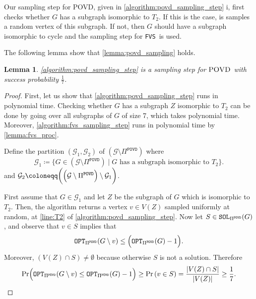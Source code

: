 \documentclass[letterpaper,11pt]{article}
\newcommand{\abs}[1]{{\left| #1\right|}}
\newcommand{\1}[1]{\mathds{1}\left[#1\right]}
\newcommand{\sat}{\textnormal{\texttt{SOL}}}
\newcommand{\OPT}{\textnormal{\texttt{OPT}}}
\newtheorem{lemma}[theorem]{Lemma}
\newcommand{\FVS}{\textnormal{\texttt{FVS}}\xspace}
\newcommand{\povdPi}{\Pi^{\texttt{POVD}}}
\newcommand{\spovd}{\textsc{POVD}\xspace}
\begin{document}
Our sampling step for \spovd, given in 
\cref{algorithm:povd_sampling_step} i,
first checks whether $G$ has a subgraph isomorphic to $T_2$. If this is the case, is samples a random vertex of this subgraph. 
If not, then $G$ should have a subgraph isomorphic to cycle and the sampling step for \FVS\ is used.

The following lemma show that \cref{lemma:povd_sampling} holds.
\begin{lemma}\label{lemma:fvs_sampling_steo}
	\cref{algorithm:povd_sampling_step} is a sampling step for $\spovd$
	with success probability $\frac{1}{7}$.
\end{lemma}

\begin{proof}
	First, let us show that \cref{algorithm:povd_sampling_step} runs in polynomial time.
	Checking whether $G$ has a subgraph $Z$ isomorphic to $T_2$ can be done
	by going over all subgraphs of $G$ of size 7, which takes polynomial time.
	Moreover, \cref{algorithm:fvs_sampling_step} runs in polynomial time
	by \cref{lemma:fvs_proc}.

	Define the partition $(\mathcal{G}_1,\mathcal{G}_2)$ of $\left( \mathcal{G} \setminus \povdPi \right)$ where
	\begin{equation*}
		\mathcal{G}_1 \coloneqq \{G \in \left( \mathcal{G} \setminus \povdPi \right) \mid G \text{ has a subgraph isomorphic to } T_2 \}. 
	\end{equation*}
	and $\mathcal{G}_2 \coloneqq \biggl(\Bigl( \mathcal{G} \setminus \povdPi \Bigr) \setminus \mathcal{G}_1\biggr)$.

	



	

	First assume that $G \in \mathcal{G}_1$ and let $Z$ be the subgraph of $G$ which
	is isomorphic to $T_2$. Then, the algorithm returns a vertex $v \in V(Z)$
	sampled uniformly at random, at \cref{line:T2} of \cref{algorithm:povd_sampling_step}.
	Now let $S \in \sat_{\povdPi}(G)$, and observe that $v \in S$ implies that
	\begin{equation*}
		\OPT_{\povdPi}(G \setminus v) \leq \Bigl(\OPT_{\povdPi}(G) - 1\Bigr).
	\end{equation*}
	Moreover, $(V(Z) \cap S) \neq \emptyset$ because otherwise $S$ is not a solution.
	Therefore
	\begin{equation}\label{eq:povd_eq_1}
		\Pr\Bigl( \OPT_{\povdPi}(G \setminus v) \leq \OPT_{\povdPi}(G) - 1 \Bigr) \geq \Pr\left( v \in S \right) = \frac{\abs{V(Z) \cap S}}{\abs{V(Z)}} \geq \frac{1}{7}.
	\end{equation}


\end{proof}
\end{document}
